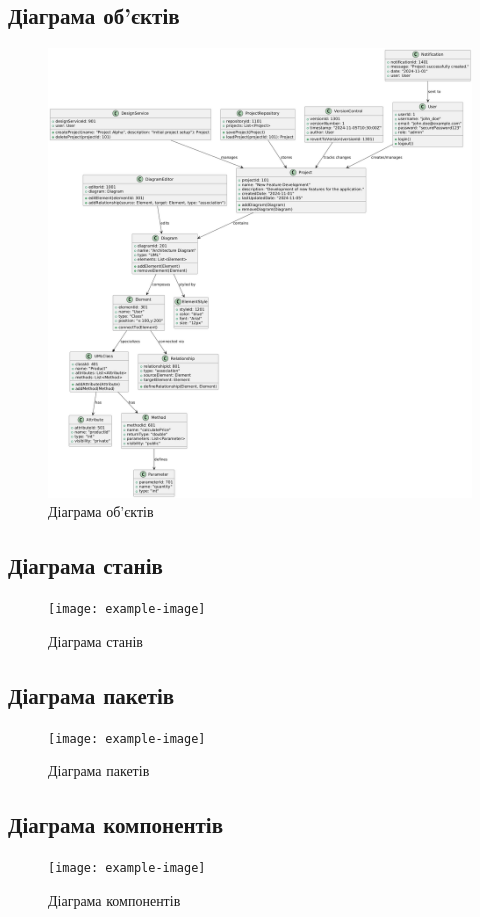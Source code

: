 \documentclass[oneside,14pt]{extarticle}
\begin{document}
\begin{normalsize}
	\subsection{Діаграма об’єктів}
	\begin{figure}[H]
		\centering
		\includegraphics[width=\columnwidth]{6}
		\caption{Діаграма об’єктів}
	\end{figure}
	
	\subsection{Діаграма станів}
	\begin{figure}[H]
		\centering
		\texttt{[image: example-image]}
		\caption{Діаграма станів}
	\end{figure}
	
	\subsection{Діаграма пакетів}
	\begin{figure}[H]
		\centering
		\texttt{[image: example-image]}
		\caption{Діаграма пакетів}
	\end{figure}
	
	\subsection{Діаграма компонентів}
	\begin{figure}[H]
		\centering
		\texttt{[image: example-image]}
		\caption{Діаграма компонентів}
	\end{figure}
	

\end{normalsize}
\end{document}
